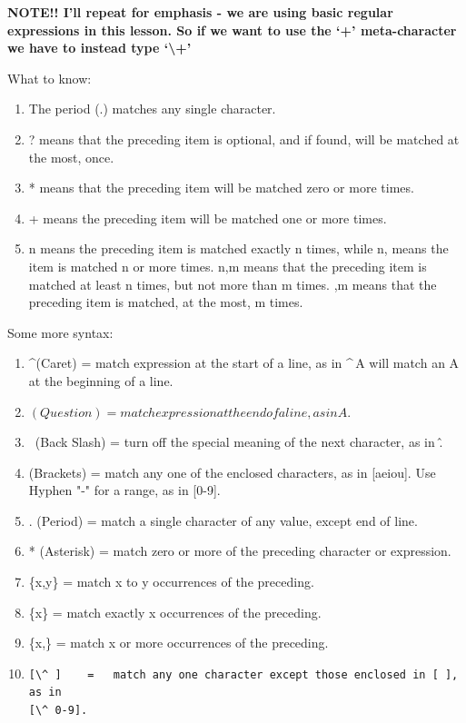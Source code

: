 \documentclass[10pt]{article}
\begin{document}
{\LARGE\textbf{NOTE!! I'll repeat for emphasis - we are using basic regular
expressions in this lesson. So if we want to use the `+' meta-character we have
to instead type `\textbackslash+'}}

What to know:
\begin{enumerate}
\item The period (.) matches any single character.
\item ? means that the preceding item is optional, and if found, will be matched at the most, once.
\item * means that the preceding item will be matched zero or more times.
\item + means the preceding item will be matched one or more times.
\item {n} means the preceding item is matched exactly n times, while {n,} means the item is matched n or more times. {n,m} means that the preceding item is matched at least n times, but not more than m times. {,m} means that the preceding item is matched, at the most, m times.
\end{enumerate}

Some more syntax:
\begin{enumerate}
\item \textasciicircum (Caret)   =   match expression at the start of a line, as
in \textasciicircum\,A will match an A at the beginning of a line.
\item $ (Question)    =   match expression at the end of a line, as in A$.
\item \ (Back Slash)  =   turn off the special meaning of the next character, as in \^.
\item [ ] (Brackets)  =   match any one of the enclosed characters, as in [aeiou]. Use Hyphen "-" for a range, as in [0-9].
\item . (Period)  =   match a single character of any value, except end of line.
\item * (Asterisk)    =   match zero or more of the preceding character or expression.
\item \{x,y\} =   match x to y occurrences of the preceding.
\item \{x\}   =   match exactly x occurrences of the preceding.
\item  \{x,\}  =   match x or more occurrences of the preceding.
\item \begin{verbatim}[\^ ]    =   match any one character except those enclosed in [ ], as in
[\^ 0-9].\end{verbatim}
\end{enumerate}
\end{document}
